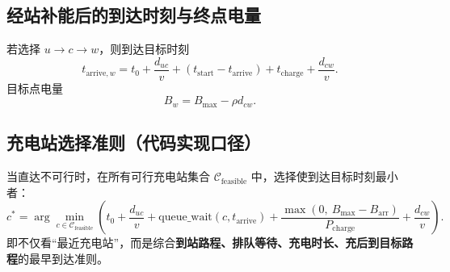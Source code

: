 \documentclass[UTF8,a4paper]{ctexart}
\begin{document}
\subsection{经站补能后的到达时刻与终点电量}
若选择 $u\rightarrow c\rightarrow w$，则到达目标时刻
\begin{equation}
  t_{\mathrm{arrive},w}
  =t_0+\frac{d_{uc}}{v}+\left(t_{\mathrm{start}}-t_{\mathrm{arrive}}\right)+t_{\mathrm{charge}}+\frac{d_{cw}}{v}.
\end{equation}
目标点电量
\begin{equation}
  B_w=B_{\max}-\rho d_{cw}.
\end{equation}

\subsection{充电站选择准则（代码实现口径）}
当直达不可行时，在所有可行充电站集合 $\mathcal{C}_{\mathrm{feasible}}$ 中，选择使到达目标时刻最小者：
\begin{equation}
  c^*=\arg\min_{c\in\mathcal{C}_{\mathrm{feasible}}}
  \left(
    t_0+\frac{d_{uc}}{v}
    +\text{queue\_wait}(c,t_{\mathrm{arrive}})
    +\frac{\max(0,\ B_{\max}-B_{\mathrm{arr}})}{P_{\mathrm{charge}}}
    +\frac{d_{cw}}{v}
  \right).
\end{equation}
即不仅看“最近充电站”，而是综合\textbf{到站路程、排队等待、充电时长、充后到目标路程}的最早到达准则。
\end{document}
